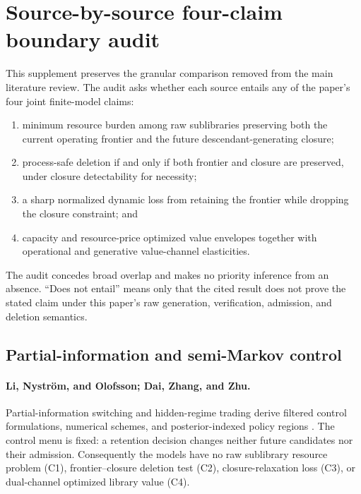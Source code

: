 \section{Source-by-source four-claim boundary audit}
\label{supp:literature-novelty-audit}

This supplement preserves the granular comparison removed from the main
literature review.  The audit asks whether each source entails any of the
paper's four joint finite-model claims:
\begin{enumerate}
\item[\textbf{C1.}] minimum resource burden among raw sublibraries preserving
  both the current operating frontier and the future descendant-generating
  closure;
\item[\textbf{C2.}] process-safe deletion if and only if both frontier and
  closure are preserved, under closure detectability for necessity;
\item[\textbf{C3.}] a sharp normalized dynamic loss from retaining the
  frontier while dropping the closure constraint; and
\item[\textbf{C4.}] capacity and resource-price optimized value envelopes
  together with operational and generative value-channel elasticities.
\end{enumerate}
The audit concedes broad overlap and makes no priority inference from an
absence.  ``Does not entail'' means only that the cited result does not prove
the stated claim under this paper's raw generation, verification, admission,
and deletion semantics.

\subsection{Partial-information and semi-Markov control}

\paragraph{Li, Nystr\"om, and Olofsson; Dai, Zhang, and Zhu.}
Partial-information switching and hidden-regime trading derive filtered
control formulations, numerical schemes, and posterior-indexed policy regions
\cite{LiNystromOlofsson2015,DaiZhangZhu2010}.  The control menu is fixed: a
retention decision changes neither future candidates nor their admission.
Consequently the models have no raw sublibrary resource problem (C1),
frontier--closure deletion test (C2), closure-relaxation loss (C3), or
dual-channel optimized library value (C4).

